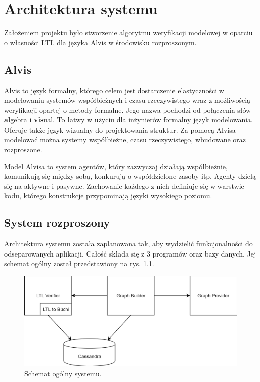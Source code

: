 \chapter{Architektura systemu}

Założeniem projektu było stworzenie algorytmu weryfikacji modelowej w oparciu o własności LTL dla języka Alvis w środowisku rozproszonym.


\section{Alvis}

Alvis to język formalny, którego celem jest dostarczenie elastyczności w modelowaniu systemów współbieżnych i czasu rzeczywistego wraz z możliwością weryfikacji opartej o metody formalne.
Jego nazwa pochodzi od połączenia słów \textbf{al}gebra i \textbf{vis}ual.
To łatwy w użyciu dla inżynierów formalny język modelowania.
Oferuje także język wizualny do projektowania struktur.
Za pomocą Alvisa modelować można systemy współbieżne, czasu rzeczywistego, wbudowane oraz rozproszone.

Model Alvisa to system agentów, który zazwyczaj działają współbieżnie, komunikują się między sobą, konkurują o współdzielone zasoby itp.
Agenty dzielą się na aktywne i pasywne.
Zachowanie każdego z nich definiuje się w warstwie kodu, którego konstrukcje przypominają języki wysokiego poziomu.



\section{System rozproszony}

Architektura systemu została zaplanowana tak, aby wydzielić funkcjonalności do odseparowanych aplikacji.
Całość składa się z 3 programów oraz bazy danych.
Jej schemat ogólny został przedstawiony na rys. \ref{fig:system_overview}.

\begin{figure}[h]
    \centering
    \includegraphics[width=\linewidth,keepaspectratio]{img/system_overview.png}
    \caption{Schemat ogólny systemu.}
    \label{fig:system_overview}
\end{figure}

